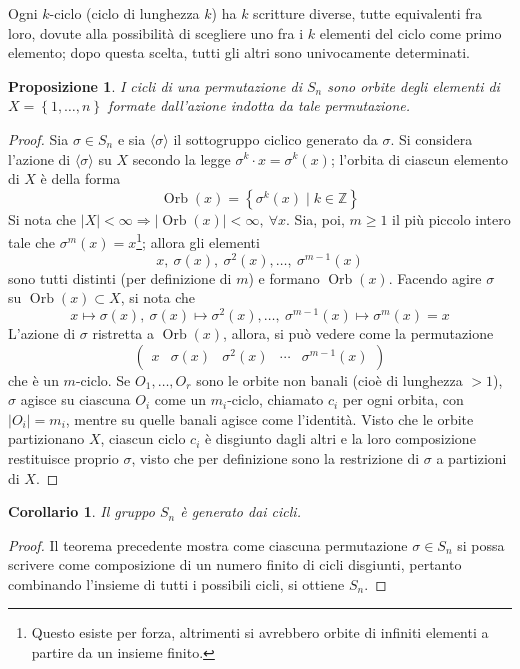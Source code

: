 \documentclass[11pt]{article}
\theoremstyle{style}
\newtheorem{prop}{Proposizione}[section]
\newtheorem{corollario}{Corollario}[teorema]
\numberwithin{equation}{subsection}
\begin{document}
Ogni $k$-ciclo (ciclo di lunghezza $k$) ha $k$ scritture diverse, tutte equivalenti fra loro, dovute alla possibilit\`a di scegliere uno fra i $k$ elementi del ciclo come primo elemento; dopo questa scelta, tutti gli altri sono univocamente determinati.
\begin{prop}
	I cicli di una permutazione di $S_n$ sono orbite degli elementi di $X = \left\{ 1,\ldots,n \right\} $ formate dall'azione indotta da tale permutazione.
\end{prop}
	\begin{proof}
		Sia $\sigma \in S_n$ e sia $\langle \sigma  \rangle$ il sottogruppo ciclico generato da $\sigma $.
		Si considera l'azione di $\langle \sigma  \rangle$ su $X$ secondo la legge $\sigma ^k \cdot x = \sigma ^k (x)$; l'orbita di ciascun elemento di $X$ \`e della forma
		\[
		\operatorname{Orb} (x) = \left\{ \sigma ^k(x)  \mid  k \in \mathbb{Z} \right\} 
		\] 
		Si nota che $\lvert X \rvert < \infty \Rightarrow  \lvert \operatorname{Orb} (x) \rvert < \infty, \ \forall x$. 
		Sia, poi, $m\ge 1$ il pi\`u piccolo intero tale che $\sigma ^m(x) = x$\footnote{Questo esiste per forza, altrimenti si avrebbero orbite di infiniti elementi a partire da un insieme finito.}; allora gli elementi 
		\[
		x, \ \sigma (x) , \ \sigma ^2 (x) , \ldots,\ \sigma ^{m-1} (x)
		\] 
		sono tutti distinti (per definizione di $m$) e formano $\operatorname{Orb} (x)$.
		Facendo agire $\sigma $ su $\operatorname{Orb} (x) \subset X$, si nota che 
		\[
		x \mapsto \sigma (x) , \ \sigma (x) \mapsto \sigma ^2(x) ,\ldots, \ \sigma ^{m-1} (x) \mapsto \sigma ^m(x) = x
		\] 
		L'azione di $\sigma $ ristretta a $\operatorname{Orb} (x)$, allora, si pu\`o vedere come la permutazione
		\[
			\begin{pmatrix} x & \sigma (x) & \sigma ^2 (x) & \cdots & \sigma ^{m-1} (x)\end{pmatrix} 
		\] 
		che \`e un $m$-ciclo. Se $O_1,\ldots,O_r$ sono le orbite non banali (cio\`e di lunghezza $>1$), $\sigma $ agisce su ciascuna $O_i$ come un $m_i$-ciclo, chiamato $c_i$ per ogni orbita, con $\lvert O_i \rvert = m_i$, mentre su quelle banali agisce come l'identit\`a.
Visto che le orbite partizionano $X$, ciascun ciclo $c_i$ \`e disgiunto dagli altri e la loro composizione restituisce proprio $\sigma $, visto che per definizione sono la restrizione di $\sigma $ a partizioni di $X$.
	\end{proof}
\begin{corollario}\label{sncic}
	Il gruppo $S_n$ \`e generato dai cicli.
\end{corollario}
	\begin{proof}
		Il teorema precedente mostra come ciascuna permutazione $\sigma \in S_n$ si possa scrivere come composizione di un numero finito di cicli disgiunti, pertanto combinando l'insieme di tutti i possibili cicli, si ottiene $S_n$.
	\end{proof}
\end{document}
